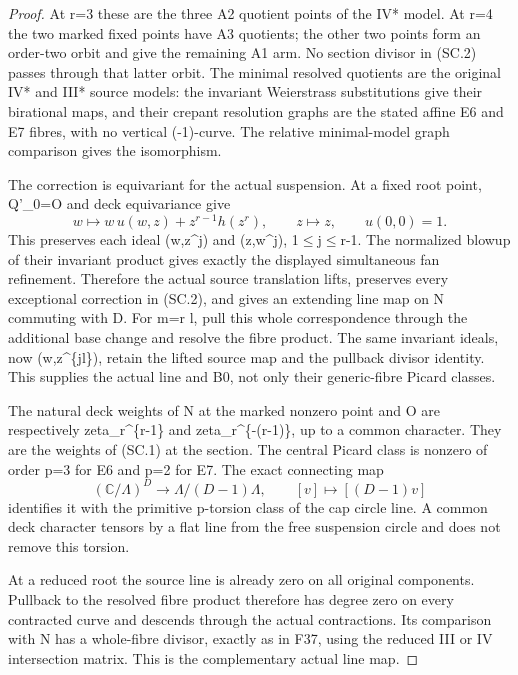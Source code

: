 \begin{proof}
At r=3 these are the three A2 quotient points of the IV* model.
At r=4 the two marked fixed points have A3 quotients; the other
two points form an order-two orbit and give the remaining A1
arm. No section divisor in (SC.2) passes through that latter
orbit. The minimal resolved quotients are the original IV* and
III* source models: the invariant Weierstrass substitutions give
their birational maps, and their crepant resolution graphs are
the stated affine E6 and E7 fibres, with no vertical (-1)-curve.
The relative minimal-model graph comparison gives the isomorphism.

The correction is equivariant for the actual suspension. At a
fixed root point, Q'\_0=O and deck equivariance give
\[
 w\longmapsto w\,u(w,z)+z^{r-1}h(z^r),\qquad z\longmapsto z,
 \qquad u(0,0)=1.
\]
This preserves each ideal (w,z\^{}j) and (z,w\^{}j), 1\(\le\)j\(\le\)r-1.
The normalized blowup of their invariant product gives exactly
the displayed simultaneous fan refinement. Therefore the actual
source translation lifts, preserves every exceptional correction
in (SC.2), and gives an extending line map on N commuting with D.
For m=r l, pull this whole correspondence through the additional
base change and resolve the fibre product. The same invariant
ideals, now (w,z\^{}\{jl\}), retain the lifted source map and the
pullback divisor identity. This supplies the actual line and B0,
not only their generic-fibre Picard classes.

The natural deck weights of N at the marked nonzero point and O
are respectively zeta\_r\^{}\{r-1\} and zeta\_r\^{}\{-(r-1)\}, up to a common
character. They are the weights of (SC.1) at the section. The
central Picard class is nonzero of order p=3 for E6 and p=2 for
E7. The exact connecting map
\[
 (\mathbb C/\Lambda)^D\longrightarrow\Lambda/(D-1)\Lambda,
 \qquad[v]\longmapsto[(D-1)v]
\]
identifies it with the primitive p-torsion class of the cap circle
line. A common deck character tensors by a flat line from the
free suspension circle and does not remove this torsion.

At a reduced root the source line is already zero on all original
components. Pullback to the resolved fibre product therefore has
degree zero on every contracted curve and descends through the
actual contractions. Its comparison with N has a whole-fibre
divisor, exactly as in F37, using the reduced III or IV
intersection matrix. This is the complementary actual line map.

\par


\end{proof}
